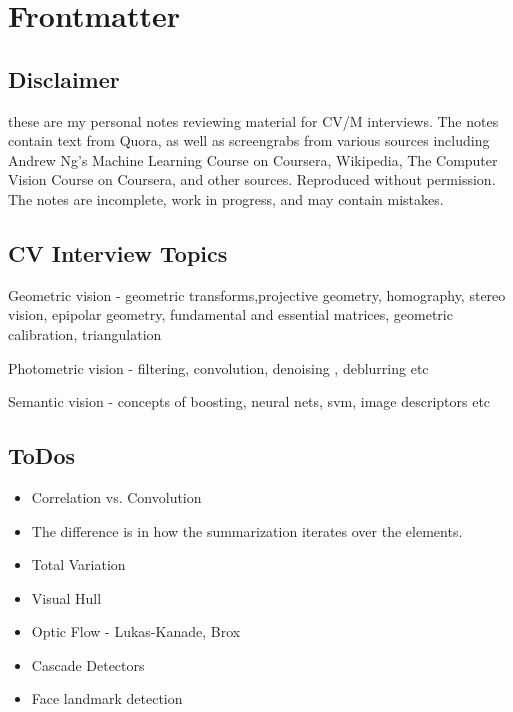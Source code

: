 \chapter{Frontmatter}
\label{chap:frontmatter}

\section{Disclaimer}

these are my personal notes reviewing material for CV/M interviews. The notes contain text from Quora, as well as screengrabs from various sources including Andrew Ng's Machine Learning Course on Coursera, Wikipedia, The Computer Vision Course on Coursera, and other sources. Reproduced without permission. The notes are incomplete, work in progress, and may contain mistakes.

\section{CV Interview Topics}

Geometric vision - geometric transforms,projective geometry, homography, stereo vision, epipolar geometry, fundamental and essential matrices, geometric calibration, triangulation

Photometric vision - filtering, convolution, denoising , deblurring etc

Semantic vision - concepts of boosting, neural nets, svm,  image descriptors etc

\section{ToDos}

\begin{itemize}
\item Correlation vs. Convolution
\item The difference is in how the summarization iterates over the elements.
\item Total Variation
\item Visual Hull
\item Optic Flow - Lukas-Kanade, Brox
\item Cascade Detectors
\item Face landmark detection
\end{itemize}